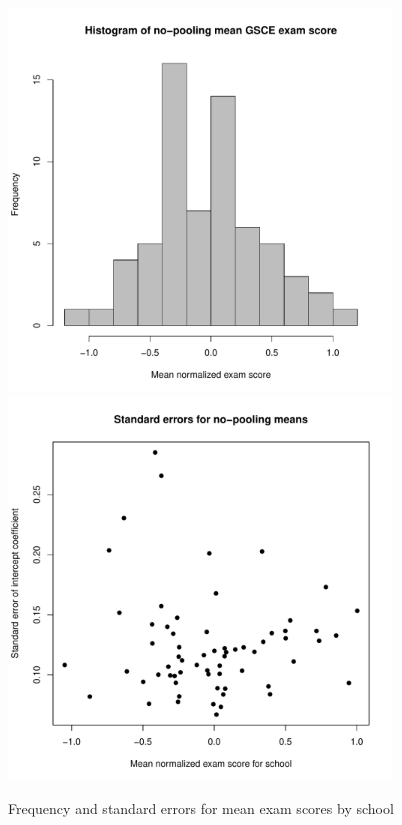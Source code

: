 \documentclass{article}
\begin{document}
\begin{figure}[H]
\centering
\includegraphics[width = 4in]{figures/no_pooling.pdf}
\includegraphics[width = 4in]{figures/no_pooling_se.pdf}
\caption{Frequency and standard errors for mean exam scores by school}
\label{no pooling}
\end{figure}
\end{document}

